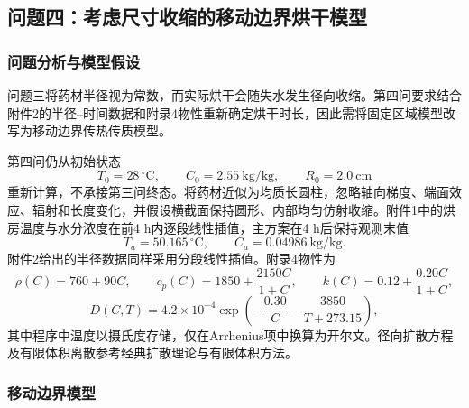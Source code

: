 
\subsection{问题四：考虑尺寸收缩的移动边界烘干模型}
\label{subsec:q4_shrink}

\subsubsection{问题分析与模型假设}

问题三将药材半径视为常数，而实际烘干会随失水发生径向收缩。第四问要求结合附件2的半径--时间数据和附录4物性重新确定烘干时长，因此需将固定区域模型改写为移动边界传热传质模型。

第四问仍从初始状态
\[
T_0=28\,^{\circ}\mathrm C,\qquad C_0=2.55\ \mathrm{kg/kg},\qquad R_0=2.0\ \mathrm{cm}
\]
重新计算，不承接第三问终态。将药材近似为均质长圆柱，忽略轴向梯度、端面效应、辐射和长度变化，并假设横截面保持圆形、内部均匀仿射收缩。附件1中的烘房温度与水分浓度在前4 h内逐段线性插值，主方案在4 h后保持观测末值
\[
T_a=50.165\,^{\circ}\mathrm C,\qquad C_a=0.04986\ \mathrm{kg/kg}.
\]
附件2给出的半径数据同样采用分段线性插值。附录4物性为
\begin{equation}
\rho(C)=760+90C,\qquad
c_p(C)=1850+\frac{2150C}{1+C},\qquad
k(C)=0.12+\frac{0.20C}{1+C},
\label{eq:q4_props}
\end{equation}
\begin{equation}
D(C,T)=4.2\times10^{-4}
\exp\!\left(-\frac{0.30}{C}-\frac{3850}{T+273.15}\right),
\label{eq:q4_diff}
\end{equation}
其中程序中温度以摄氏度存储，仅在Arrhenius项中换算为开尔文。径向扩散方程及有限体积离散参考经典扩散理论与有限体积方法\cite{crank1975,patankar1980}。

\subsubsection{移动边界模型}

